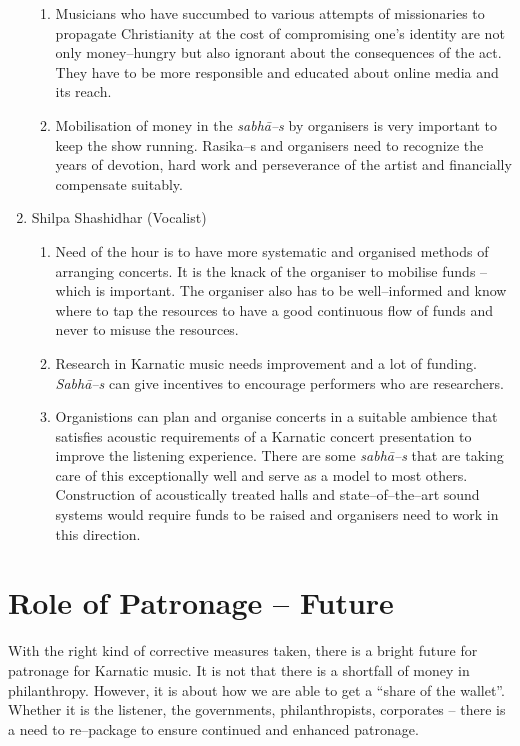 \begin{enumerate}
\begin{enumerate}
 \item Musicians who have succumbed to various attempts of missionaries to propagate Christianity at the cost of compromising one’s identity are not only money–hungry but also ignorant about the consequences of the act. They have to be more responsible and educated about online media and its reach.

 \item Mobilisation of money in the \textit{sabhā–s} by organisers is very important to keep the show running. Rasika–s and organisers need to recognize the years of devotion, hard work and perseverance of the artist and financially compensate suitably.
\end{enumerate}

 \item Shilpa Shashidhar (Vocalist)
 
\begin{enumerate}
\itemsep=0pt
\item Need of the hour is to have more systematic and organised methods of arranging concerts. It is the knack of the organiser to mobilise funds – which is important. The organiser also has to be well–informed and know where to tap the resources to have a good continuous flow of funds and never to misuse the resources.

 \item Research in Karnatic music needs improvement and a lot of funding. \textit{Sabhā–s} can give incentives to encourage performers who are researchers.

 \item Organistions can plan and organise concerts in a suitable ambience that satisfies acoustic requirements of a Karnatic concert presentation to improve the listening experience. There are some \textit{sabhā–s} that are taking care of this exceptionally well and serve as a model to most others. Construction of acoustically treated halls and state–of–the–art sound systems would require funds to be raised and organisers need to work in this direction.
\end{enumerate}

\end{enumerate}


\section*{Role of Patronage – Future}

With the right kind of corrective measures taken, there is a bright future for patronage for Karnatic music. It is not that there is a shortfall of money in philanthropy. However, it is about how we are able to get a “share of the wallet”. Whether it is the listener, the governments, philanthropists, corporates – there is a need to re–package to ensure continued and enhanced patronage.

